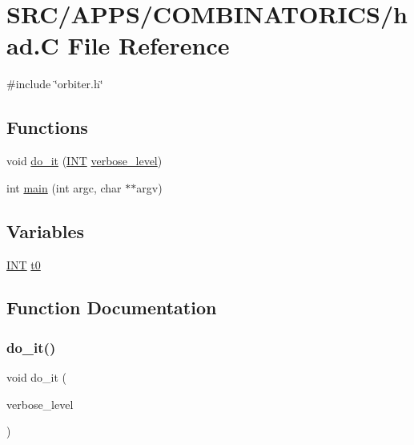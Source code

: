 \hypertarget{had_8_c}{}\section{S\+R\+C/\+A\+P\+P\+S/\+C\+O\+M\+B\+I\+N\+A\+T\+O\+R\+I\+C\+S/had.C File Reference}
\label{had_8_c}
{\ttfamily \#include \char`\"{}orbiter.\+h\char`\"{}}\newline
\subsection*{Functions}
\begin{DoxyCompactItemize}
\item 
void \mbox{\hyperlink{had_8_c_a23101cedc65bbf814b3b9ae081665765}{do\+\_\+it}} (\mbox{\hyperlink{galois_8h_a09fddde158a3a20bd2dcadb609de11dc}{I\+NT}} \mbox{\hyperlink{simeon_8_c_a818073fbcc2f439e7c56952f67386122}{verbose\+\_\+level}})
\item 
int \mbox{\hyperlink{had_8_c_a3c04138a5bfe5d72780bb7e82a18e627}{main}} (int argc, char $\ast$$\ast$argv)
\end{DoxyCompactItemize}
\subsection*{Variables}
\begin{DoxyCompactItemize}
\item 
\mbox{\hyperlink{galois_8h_a09fddde158a3a20bd2dcadb609de11dc}{I\+NT}} \mbox{\hyperlink{had_8_c_a4268f4fe222ffb119218a0199f5e1904}{t0}}
\end{DoxyCompactItemize}


\subsection{Function Documentation}
\mbox{\label{had_8_c_a23101cedc65bbf814b3b9ae081665765}} 
\subsubsection{\texorpdfstring{do\+\_\+it()}{do\_it()}}
{\footnotesize\ttfamily void do\+\_\+it (\begin{DoxyParamCaption}\item[{\mbox{\hyperlink{galois_8h_a09fddde158a3a20bd2dcadb609de11dc}{I\+NT}}}]{verbose\+\_\+level }\end{DoxyParamCaption})}

